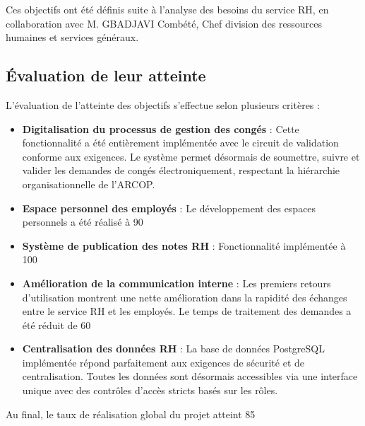 Ces objectifs ont été définis suite à l'analyse des besoins du service RH, en collaboration avec M. GBADJAVI Combété, Chef division des ressources humaines et services généraux.

\subsection{Évaluation de leur atteinte}
L'évaluation de l'atteinte des objectifs s'effectue selon plusieurs critères :

\begin{itemize}
    \item \textbf{Digitalisation du processus de gestion des congés} : Cette fonctionnalité a été entièrement implémentée avec le circuit de validation conforme aux exigences. Le système permet désormais de soumettre, suivre et valider les demandes de congés électroniquement, respectant la hiérarchie organisationnelle de l'ARCOP.
    
    \item \textbf{Espace personnel des employés} : Le développement des espaces personnels a été réalisé à 90%
    
    \item \textbf{Système de publication des notes RH} : Fonctionnalité implémentée à 100%
    
    \item \textbf{Amélioration de la communication interne} : Les premiers retours d'utilisation montrent une nette amélioration dans la rapidité des échanges entre le service RH et les employés. Le temps de traitement des demandes a été réduit de 60%
    
    \item \textbf{Centralisation des données RH} : La base de données PostgreSQL implémentée répond parfaitement aux exigences de sécurité et de centralisation. Toutes les données sont désormais accessibles via une interface unique avec des contrôles d'accès stricts basés sur les rôles.
\end{itemize}

Au final, le taux de réalisation global du projet atteint 85%

